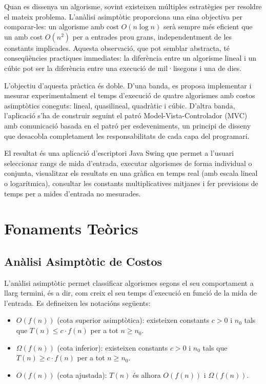 \documentclass[conference,compsoc]{IEEEtran}
\begin{document}
Quan es dissenya un algorisme, sovint existeixen múltiples estratègies per
resoldre el mateix problema. L'anàlisi asimptòtic proporciona una eina
objectiva per comparar-les: un algorisme amb cost $O(n \log n)$ serà
sempre més eficient que un amb cost $O(n^2)$ per a entrades prou grans,
independentment de les constants implicades. Aquesta observació, que pot
semblar abstracta, té conseqüències practiques immediates: la diferència
entre un algorisme lineal i un cúbic pot ser la diferència entre una
execució de mil·lisegons i una de dies.

L'objectiu d'aquesta pràctica és doble. D'una banda, es proposa
implementar i mesurar experimentalment el temps d'execució de quatre
algorismes amb costos asimptòtics coneguts: lineal, quasilineal, quadràtic
i cúbic. D'altra banda, l'aplicació s'ha de construir seguint el patró
Model-Vista-Controlador (MVC) amb comunicació basada en el patró per
esdeveniments, un principi de disseny que desacobla completament les
responsabilitats de cada capa del programari.

El resultat és una aplicació d'escriptori Java Swing que permet a l'usuari
seleccionar rangs de mida d'entrada, executar algorismes de forma
individual o conjunta, visualitzar els resultats en una gràfica en temps
real (amb escala lineal o logarítmica), consultar les constants
multiplicatives mitjanes i fer previsions de temps per a mides d'entrada
no mesurades.

\section{Fonaments Teòrics}

\subsection{Anàlisi Asimptòtic de Costos}

L'anàlisi asimptòtic permet classificar algorismes segons el seu
comportament a llarg termini, és a dir, com creix el seu temps d'execució
en funció de la mida de l'entrada. Es defineixen les
notacións següents:

\begin{itemize}
    \item \textbf{$O(f(n))$} (cota superior asimptòtica): existeixen
          constants $c > 0$ i $n_0$ tals que $T(n) \leq c \cdot f(n)$ per
          a tot $n \geq n_0$.
    \item \textbf{$\Omega(f(n))$} (cota inferior): existeixen constants
          $c > 0$ i $n_0$ tals que $T(n) \geq c \cdot f(n)$ per a tot
          $n \geq n_0$.
    \item \textbf{$O(f(n))$} (cota ajustada): $T(n)$ és alhora
          $O(f(n))$ i $\Omega(f(n))$.
\end{itemize}
\end{document}
